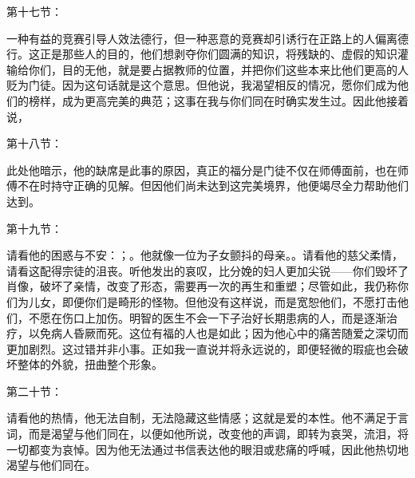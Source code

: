 第十七节：\par

一种有益的竞赛引导人效法德行，但一种恶意的竞赛却引诱行在正路上的人偏离德行。这正是那些人的目的，他们想剥夺你们圆满的知识，将残缺的、虚假的知识灌输给你们，目的无他，就是要占据教师的位置，并把你们这些本来比他们更高的人贬为门徒。因为这句话就是这个意思。但他说，我渴望相反的情况，愿你们成为他们的榜样，成为更高完美的典范；这事在我与你们同在时确实发生过。因此他接着说，\par

第十八节：\par

此处他暗示，他的缺席是此事的原因，真正的福分是门徒不仅在师傅面前，也在师傅不在时持守正确的见解。但因他们尚未达到这完美境界，他便竭尽全力帮助他们达到。\par

第十九节：\par

请看他的困惑与不安：；。他就像一位为子女颤抖的母亲。。请看他的慈父柔情，请看这配得宗徒的沮丧。听他发出的哀叹，比分娩的妇人更加尖锐——你们毁坏了肖像，破坏了亲情，改变了形态，需要再一次的再生和重塑；尽管如此，我仍称你们为儿女，即便你们是畸形的怪物。但他没有这样说，而是宽恕他们，不愿打击他们，不愿在伤口上加伤。明智的医生不会一下子治好长期患病的人，而是逐渐治疗，以免病人昏厥而死。这位有福的人也是如此；因为他心中的痛苦随爱之深切而更加剧烈。这过错并非小事。正如我一直说并将永远说的，即便轻微的瑕疵也会破坏整体的外貌，扭曲整个形象。\par

第二十节：\par

请看他的热情，他无法自制，无法隐藏这些情感；这就是爱的本性。他不满足于言词，而是渴望与他们同在，以便如他所说，改变他的声调，即转为哀哭，流泪，将一切都变为哀悼。因为他无法通过书信表达他的眼泪或悲痛的呼喊，因此他热切地渴望与他们同在。\par

